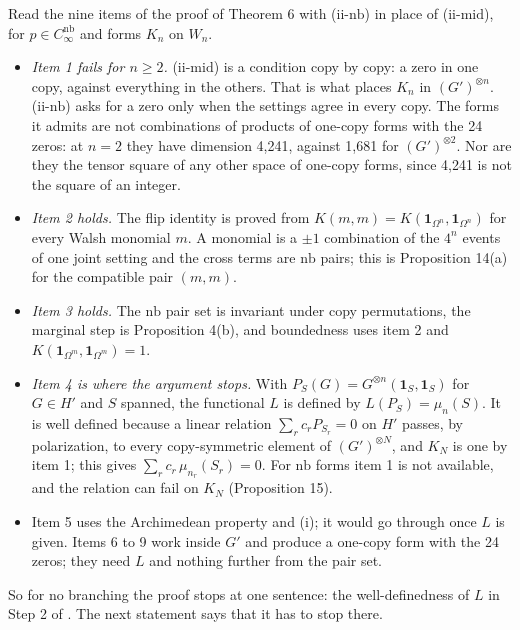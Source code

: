 \documentclass[11pt,a4paper]{article}
\theoremstyle{definition}
\theoremstyle{remark}
\newcommand{\ind}[1]{\mathbf{1}_{#1}}
\newcommand{\nb}{\mathrm{nb}}
\newcommand{\md}{\mathrm{mid}}
\begin{document}
Read the nine items of the proof of Theorem 6 with (ii-$\nb$) in place of (ii-$\md$), for $p \in C_\infty^{\nb}$ and forms $K_n$ on $W_n$.
\begin{itemize}
  \item \emph{Item 1 fails for $n \ge 2$.} (ii-$\md$) is a condition copy by copy: a zero in one copy, against everything in the others. That is what places $K_n$ in $(G')^{\otimes n}$. (ii-$\nb$) asks for a zero only when the settings agree in every copy. The forms it admits are not combinations of products of one-copy forms with the 24 zeros: at $n = 2$ they have dimension 4{,}241, against 1{,}681 for $(G')^{\otimes 2}$. Nor are they the tensor square of any other space of one-copy forms, since 4{,}241 is not the square of an integer.
  \item \emph{Item 2 holds.} The flip identity is proved from $K(m, m) = K(\ind{\Omega^n}, \ind{\Omega^n})$ for every Walsh monomial $m$. A monomial is a $\pm 1$ combination of the $4^n$ events of one joint setting and the cross terms are $\nb$ pairs; this is Proposition 14(a) for the compatible pair $(m, m)$.
  \item \emph{Item 3 holds.} The $\nb$ pair set is invariant under copy permutations, the marginal step is Proposition 4(b), and boundedness uses item 2 and $K(\ind{\Omega^m}, \ind{\Omega^m}) = 1$.
  \item \emph{Item 4 is where the argument stops.} With $P_S(G) = G^{\otimes n}(\ind{S}, \ind{S})$ for $G \in H'$ and $S$ spanned, the functional $L$ is defined by $L(P_S) = \mu_n(S)$. It is well defined because a linear relation $\sum_r c_r P_{S_r} = 0$ on $H'$ passes, by polarization, to every copy-symmetric element of $(G')^{\otimes N}$, and $K_N$ is one by item 1; this gives $\sum_r c_r\, \mu_{n_r}(S_r) = 0$. For $\nb$ forms item 1 is not available, and the relation can fail on $K_N$ (Proposition 15).
  \item Item 5 uses the Archimedean property and (i); it would go through once $L$ is given. Items 6 to 9 work inside $G'$ and produce a one-copy form with the 24 zeros; they need $L$ and nothing further from the pair set.
\end{itemize}
So for no branching the proof stops at one sentence: the well-definedness of $L$ in Step 2 of \cite[Theorem 13]{R7}. The next statement says that it has to stop there.
\end{document}
